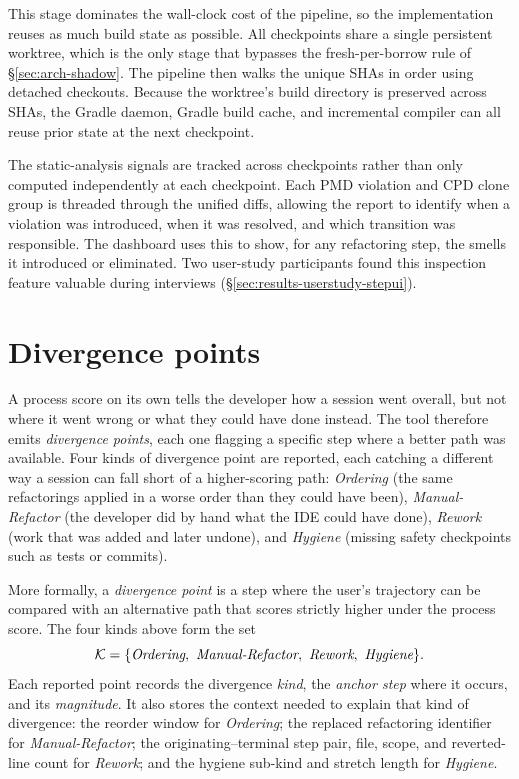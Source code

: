 This stage dominates the wall-clock cost of the pipeline, so the implementation reuses as much build state as possible. All checkpoints share a single persistent worktree, which is the only stage that bypasses the fresh-per-borrow rule of \S\ref{sec:arch-shadow}. The pipeline then walks the unique SHAs in order using detached checkouts. Because the worktree's build directory is preserved across SHAs, the Gradle daemon, Gradle build cache, and incremental compiler can all reuse prior state at the next checkpoint.

The static-analysis signals are tracked across checkpoints rather than only computed independently at each checkpoint. Each PMD violation and CPD clone group is threaded through the unified diffs, allowing the report to identify when a violation was introduced, when it was resolved, and which transition was responsible. The dashboard uses this to show, for any refactoring step, the smells it introduced or eliminated. Two user-study participants found this inspection feature valuable during interviews (\S\ref{sec:results-userstudy-stepui}).

\section{Divergence points}
\label{sec:methodology-detector}
\label{sec:arch-synthesis}

A process score on its own tells the developer how a session went overall, but not where it went wrong or what they could have done instead. The tool therefore emits \emph{divergence points}, each one flagging a specific step where a better path was available. Four kinds of divergence point are reported, each catching a different way a session can fall short of a higher-scoring path: \emph{Ordering} (the same refactorings applied in a worse order than they could have been), \emph{Manual-Refactor} (the developer did by hand what the IDE could have done), \emph{Rework} (work that was added and later undone), and \emph{Hygiene} (missing safety checkpoints such as tests or commits).

More formally, a \emph{divergence point} is a step where the user's trajectory can be compared with an alternative path that scores strictly higher under the process score. The four kinds above form the set
\[
\mathcal{K} = \{\emph{Ordering},\ \emph{Manual-Refactor},\ \emph{Rework},\ \emph{Hygiene}\}.
\]
Each reported point records the divergence \emph{kind}, the \emph{anchor step} where it occurs, and its \emph{magnitude}. It also stores the context needed to explain that kind of divergence: the reorder window for \emph{Ordering}; the replaced refactoring identifier for \emph{Manual-Refactor}; the originating--terminal step pair, file, scope, and reverted-line count for \emph{Rework}; and the hygiene sub-kind and stretch length for \emph{Hygiene}.


